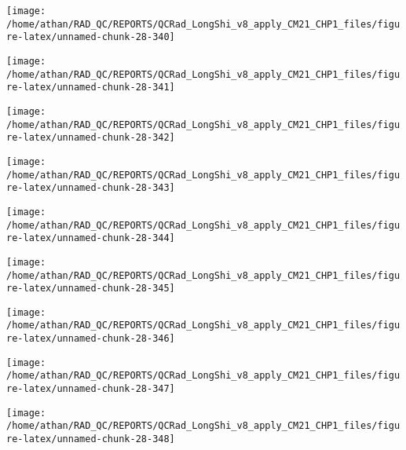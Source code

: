 \documentclass[
  10pt,
  a4paper,oneside]{article}
\begin{document}
\begin{center}\texttt{[image: /home/athan/RAD\_QC/REPORTS/QCRad\_LongShi\_v8\_apply\_CM21\_CHP1\_files/figure-latex/unnamed-chunk-28-340]} \end{center}

\begin{center}\texttt{[image: /home/athan/RAD\_QC/REPORTS/QCRad\_LongShi\_v8\_apply\_CM21\_CHP1\_files/figure-latex/unnamed-chunk-28-341]} \end{center}

\begin{center}\texttt{[image: /home/athan/RAD\_QC/REPORTS/QCRad\_LongShi\_v8\_apply\_CM21\_CHP1\_files/figure-latex/unnamed-chunk-28-342]} \end{center}

\begin{center}\texttt{[image: /home/athan/RAD\_QC/REPORTS/QCRad\_LongShi\_v8\_apply\_CM21\_CHP1\_files/figure-latex/unnamed-chunk-28-343]} \end{center}

\begin{center}\texttt{[image: /home/athan/RAD\_QC/REPORTS/QCRad\_LongShi\_v8\_apply\_CM21\_CHP1\_files/figure-latex/unnamed-chunk-28-344]} \end{center}

\begin{center}\texttt{[image: /home/athan/RAD\_QC/REPORTS/QCRad\_LongShi\_v8\_apply\_CM21\_CHP1\_files/figure-latex/unnamed-chunk-28-345]} \end{center}

\begin{center}\texttt{[image: /home/athan/RAD\_QC/REPORTS/QCRad\_LongShi\_v8\_apply\_CM21\_CHP1\_files/figure-latex/unnamed-chunk-28-346]} \end{center}

\begin{center}\texttt{[image: /home/athan/RAD\_QC/REPORTS/QCRad\_LongShi\_v8\_apply\_CM21\_CHP1\_files/figure-latex/unnamed-chunk-28-347]} \end{center}

\begin{center}\texttt{[image: /home/athan/RAD\_QC/REPORTS/QCRad\_LongShi\_v8\_apply\_CM21\_CHP1\_files/figure-latex/unnamed-chunk-28-348]} \end{center}
\end{document}
